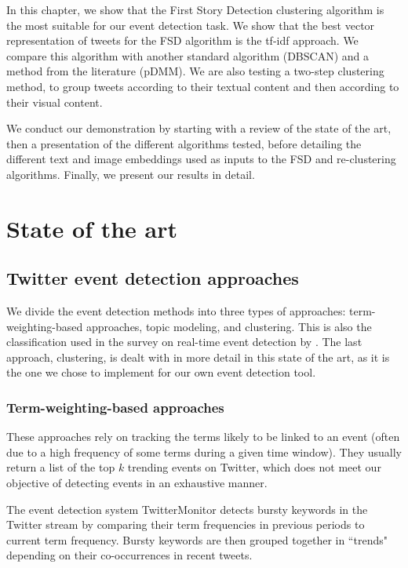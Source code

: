  In this chapter, we show that the First Story Detection clustering algorithm is the most suitable for our event detection task. We show that the best vector representation of tweets for the FSD algorithm is the tf-idf approach. We compare this algorithm with another standard algorithm (DBSCAN) and a method from the literature (pDMM). We are also testing a two-step clustering method, to group tweets according to their textual content and then according to their visual content.
 
We conduct our demonstration by starting with a review of the state of the art, then a presentation of the different algorithms tested, before detailing the different text and image embeddings used as inputs to the FSD and re-clustering algorithms. Finally, we present our results in detail.


\section{State of the art}

		
		\subsection{Twitter event detection approaches}
		We divide the event detection methods into three types of approaches: term-weighting-based approaches, topic modeling, and clustering. This is also the classification used in the survey on real-time event detection by \citet{hasan_survey_2018}. The last approach, clustering, is dealt with in more detail in this state of the art, as it is the one we chose to implement for our own event detection tool.
		
		\subsubsection{Term-weighting-based approaches}
		These approaches rely on tracking the terms likely to be linked to an event (often due to a high frequency of some terms during a given time window). They usually return a list of the top $k$ trending events on Twitter, which does not meet our objective of detecting events in an exhaustive manner.
		
		The event detection system TwitterMonitor \citep{mathioudakis_twittermonitor:_2010} detects bursty keywords in the Twitter stream by comparing their term frequencies in previous periods to current term frequency. Bursty keywords are then grouped together in ``trends" depending on their co-occurrences in recent tweets. 
		
